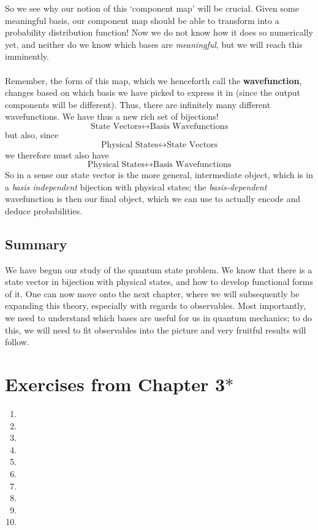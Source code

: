 So we see why our notion of this `component map' will be crucial. Given some meaningful basis, our component map should be able to transform into a probability distribution function! Now we do not know how it does so numerically yet, and neither do we know which bases are \textit{meaningful}, but we will reach this imminently. 
\\\\
Remember, the form of this map, which we henceforth call the \textbf{wavefunction}, changes based on which basis we have picked to express it in (since the output components will be different). Thus, there are infinitely many different wavefunctions. We have thus a new rich set of bijections! 
$$
\text{State Vectors} \leftrightarrow\text{Basis Wavefunctions}
$$
but also, since 
$$
\text{Physical States}\leftrightarrow \text{State Vectors} 
$$
we therefore must also have
$$
\text{Physical States}\leftrightarrow\text{Basis Wavefunctions}
$$
So in a sense our state vector is the more general, intermediate object, which is in a \textit{basis independent} bijection with physical states; the \textit{basis-dependent} wavefunction is then our final object, which we can use to actually encode and deduce probabilities. 
\subsection{Summary}
We have begun our study of the quantum state problem. We know that there is a state vector in bijection with physical states, and how to develop functional forms of it. One can now move onto the next chapter, where we will subsequently be expanding this theory, especially with regards to observables. Most importantly, we need to understand which bases are useful for us in quantum mechanics; to do this, we will need to fit observables into the picture and very fruitful results will follow. 
\section{Exercises from Chapter 3$\ast$}
\begin{enumerate}
    \item 
    \item
    \item
    \item
    \item
    \item
    \item
    \item
    \item
    \item
\end{enumerate}